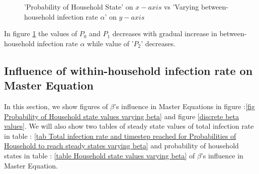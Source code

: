 \documentclass[paper=a4, fontsize=11pt, twoside, BCOR=12mm, parskip=full, listof=totoc]{scrreprt}
\begin{document}
{\begin{figure}[H]
\centering
{}
\caption{'Probability of Household State' on $x-axis$ vs 'Varying between-household infection rate $\alpha$' on $y-axis$ }
\label{discrete alpha values}
\end{figure}
In figure \ref{discrete alpha values} the values of $P_0$ and $P_1$ decreases with gradual increase in between-household infection rate $\alpha$ while value of '$P_2$' decreases.      

\subsection*{Influence of within-household infection rate on Master Equation}
\label{observation beta parameter}
In this section, we show figures of $\beta$'s influence in Master Equations in  figure :\ref{fig Probability of Household state values varying beta} and figure \ref{discrete beta values}. We will also show two tables of steady state values of total infection rate in table : \ref{tab Total infection rate and timestep reached for Probabilities of Household to reach steady states varying beta} and probability of household states in table : \ref{table Household state values varying beta} of $\beta$'s influence in Master Equation. 

}
\end{document}
